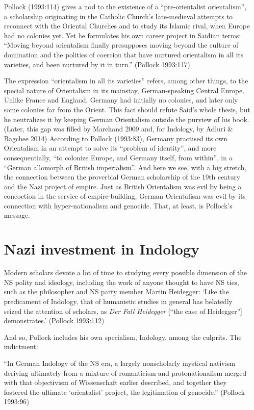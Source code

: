 Pollock (1993:114) gives a nod to the existence of a “pre-orientalist orientalism”, a scholarship originating in the Catholic Church’s late-medieval attempts to reconnect with the Oriental Churches and to study its Islamic rival, when Europe had no colonies yet. Yet he formulates his own career project in Saidian terms: “Moving beyond orientalism finally presupposes moving beyond the culture of domination and the politics of coercion that have nurtured orientalism in all its varieties, and been nurtured by it in turn.” (Pollock 1993:117)

The expression “orientalism in all its varieties” refers, among other things, to the special nature of Orientalism in its mainstay, German-speaking Central Europe. Unlike France and England, Germany had initially no colonies, and later only some colonies far from the Orient. This fact should refute Said’s whole thesis, but he neutralizes it by keeping German Orientalism outside the purview of his book. (Later, this gap was filled by Marchand 2009 and, for Indology, by Adluri \& Bagchee 2014) According to Pollock (1993:83), Germany practised its own Orientalism in an attempt to solve its “problem of identity”, and more consequentially, “to colonize Europe, and Germany itself, from within”, in a “German allomorph of British imperialism”. And here we see, with a big stretch, the connection between the proverbial German scholarship of the 19th century and the Nazi project of empire. Just as British Orientalism was evil by being a concoction in the service of empire-building, German Orientalism was evil by its connection with hyper-nationalism and genocide. That, at least, is Pollock’s message.

\section*{Nazi investment in Indology}

Modern scholars devote a lot of time to studying every possible dimension of the NS polity and ideology, including the work of anyone thought to have NS ties, such as the philosopher and NS party member Martin Heidegger: ‘Like the predicament of Indology, that of humanistic studies in general has belatedly seized the attention of scholars, as {\sl Der Fall Heidegger} [“the case of Heidegger”] demonstrates.’ (Pollock 1993:112)

And so, Pollock includes his own specialism, Indology, among the culprits. The indictment:
\begin{myquote}
“In German Indology of the NS era, a largely nonscholarly mystical nativism deriving ultimately from a mixture of romanticism and protonationalism merged with that objectivism of Wissenschaft earlier described, and together they fostered the ultimate ‘orientalist’ project, the legitimation of genocide.” \hfill(Pollock 1993:96)
\end{myquote}

